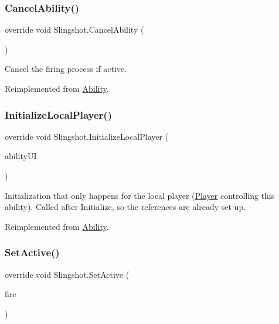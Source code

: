 \subsubsection{\texorpdfstring{Cancel\+Ability()}{CancelAbility()}}
{\footnotesize\ttfamily override void Slingshot.\+Cancel\+Ability (\begin{DoxyParamCaption}{ }\end{DoxyParamCaption})\hspace{0.3cm}{\ttfamily [virtual]}}



Cancel the firing process if active. 



Reimplemented from \hyperlink{class_ability_ab0eaf1ad670e0624a5534c50b10c002f}{Ability}.

\hypertarget{class_slingshot_a449e53a29fab847e65cb55fc3ee4490e}{}\label{class_slingshot_a449e53a29fab847e65cb55fc3ee4490e} 
\subsubsection{\texorpdfstring{Initialize\+Local\+Player()}{InitializeLocalPlayer()}}
{\footnotesize\ttfamily override void Slingshot.\+Initialize\+Local\+Player (\begin{DoxyParamCaption}\item[{\hyperlink{class_ability_u_i}{Ability\+UI}}]{ability\+UI }\end{DoxyParamCaption})\hspace{0.3cm}{\ttfamily [virtual]}}



Initialization that only happens for the local player (\hyperlink{class_player}{Player} controlling this ability). Called after Initialize, so the references are already set up. 



Reimplemented from \hyperlink{class_ability_ae8217a23a940c9ce450e827856d7020b}{Ability}.

\hypertarget{class_slingshot_a98ea94317e1fe4e56cf8e08d5b892f30}{}\label{class_slingshot_a98ea94317e1fe4e56cf8e08d5b892f30} 
\subsubsection{\texorpdfstring{Set\+Active()}{SetActive()}}
{\footnotesize\ttfamily override void Slingshot.\+Set\+Active (\begin{DoxyParamCaption}\item[{bool}]{fire }\end{DoxyParamCaption})\hspace{0.3cm}{\ttfamily [virtual]}}



